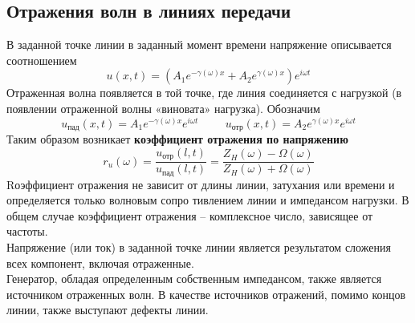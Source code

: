 \documentclass[12pt]{article}
\begin{document}
\begin{flushleft}
\subsection{Отражения волн в линиях передачи}
В заданной точке линии в заданный момент времени напряжение описывается соотношением
\begin{equation}
u(x,t) =\left( A_1e^{-\gamma(\omega)x} + A_2e^{\gamma(\omega)x}\right)e^{i\omega t}
\end{equation}
Отраженная волна
появляется в той точке, где линия соединяется с нагрузкой (в появлении отраженной волны «виновата» нагрузка).
Обозначим
\begin{equation}
u_{\text{пад}}(x,t) = A_1e^{-\gamma(\omega)x}e^{i\omega t}
\hspace{1cm}
u_{\text{отр}}(x,t) = A_2e^{\gamma(\omega)x}e^{i\omega t}
\end{equation}
Таким образом возникает \textbf{коэффициент отражения по напряжению}
\begin{equation}
r_u(\omega)=\frac{u_{\text{отр}}(l,t)}{u_{\text{пад}}(l,t)} = \frac{ Z_H(\omega) -\Omega(\omega)}{Z_H(\omega) +\Omega(\omega)}
\end{equation}
Rоэффициент отражения не зависит от длины линии, затухания или времени и определяется только волновым сопро
тивлением линии и импедансом нагрузки. В общем случае коэффициент
отражения – комплексное число, зависящее от частоты.\\
Напряжение (или ток) в заданной точке линии является результатом сложения всех компонент, включая отраженные. \\
Генератор, обладая определенным собственным импедансом, также является источником отраженных волн. В качестве источников отражений, помимо концов линии, также выступают дефекты линии. 

\end{flushleft}
\end{document}
